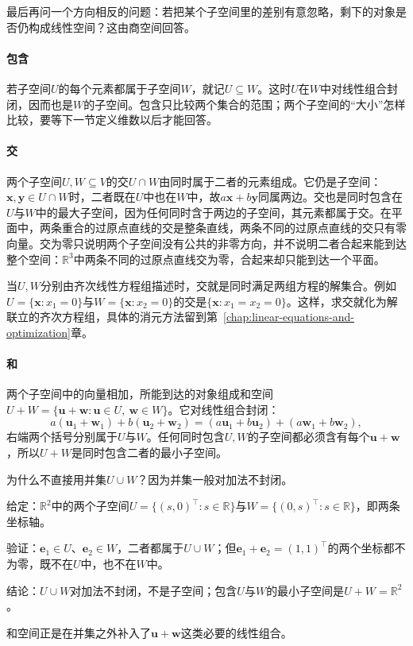 最后再问一个方向相反的问题：若把某个子空间里的差别有意忽略，剩下的对象是否仍构成线性空间？这由商空间回答。

\paragraph{包含}
\label{sec:ls-subspace-inclusion}
若子空间$U$的每个元素都属于子空间$W$，就记$U\subseteq W$。这时$U$在$W$中对线性组合封闭，因而也是$W$的子空间。包含只比较两个集合的范围；两个子空间的“大小”怎样比较，要等下一节定义维数以后才能回答。

\paragraph{交}
\label{sec:ls-intersection}
两个子空间$U,W\subseteq V$的交$U\cap W$由同时属于二者的元素组成。它仍是子空间：$\bm x,\bm y\in U\cap W$时，二者既在$U$中也在$W$中，故$a\bm x+b\bm y$同属两边。交也是同时包含在$U$与$W$中的最大子空间，因为任何同时含于两边的子空间，其元素都属于交。在平面中，两条重合的过原点直线的交是整条直线，两条不同的过原点直线的交只有零向量。交为零只说明两个子空间没有公共的非零方向，并不说明二者合起来能到达整个空间：$\mathbb R^3$中两条不同的过原点直线交为零，合起来却只能到达一个平面。

当$U,W$分别由齐次线性方程组描述时，交就是同时满足两组方程的解集合。例如$U=\{\bm x:x_1=0\}$与$W=\{\bm x:x_2=0\}$的交是$\{\bm x:x_1=x_2=0\}$。这样，求交就化为解联立的齐次方程组，具体的消元方法留到第~\ref{chap:linear-equations-and-optimization}章。

\paragraph{和}
\label{sec:ls-sum}
两个子空间中的向量相加，所能到达的对象组成和空间$U+W=\{\bm u+\bm w:\bm u\in U,\ \bm w\in W\}$。它对线性组合封闭：
\[
 a(\bm u_1+\bm w_1)+b(\bm u_2+\bm w_2)=(a\bm u_1+b\bm u_2)+(a\bm w_1+b\bm w_2),
\]
右端两个括号分别属于$U$与$W$。任何同时包含$U,W$的子空间都必须含有每个$\bm u+\bm w$，所以$U+W$是同时包含二者的最小子空间。

为什么不直接用并集$U\cup W$？因为并集一般对加法不封闭。
\begin{example}[反例：两条坐标轴的并]
\label{ex:ls-union-not-subspace}
给定：$\mathbb R^2$中的两个子空间$U=\{(s,0)^\top:s\in\mathbb R\}$与$W=\{(0,s)^\top:s\in\mathbb R\}$，即两条坐标轴。

验证：$\bm e_1\in U$、$\bm e_2\in W$，二者都属于$U\cup W$；但$\bm e_1+\bm e_2=(1,1)^\top$的两个坐标都不为零，既不在$U$中，也不在$W$中。

结论：$U\cup W$对加法不封闭，不是子空间；包含$U$与$W$的最小子空间是$U+W=\mathbb R^2$。
\end{example}
和空间正是在并集之外补入了$\bm u+\bm w$这类必要的线性组合。


